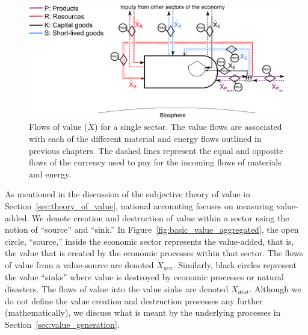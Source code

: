 \begin{figure}[!ht]
\centering
\includegraphics[width=\linewidth]{Part_2/Chapter_Values/images/PERKS_basic_unit_value_all.pdf}
\caption[Flows of value for a single sector]{Flows of value ($\dot{X}$) 
for a single sector. 
The value flows are associated with each of the different 
material and energy flows outlined in previous chapters. The dashed
lines represent the equal and opposite flows of the 
currency used to pay for the incoming flows of 
materials and energy.}
\label{fig:basic_value} 
\end{figure}

As mentioned in the discussion of the subjective theory of value in Section~\ref{sec:theory_of_value}, national accounting focuses on
measuring value-added. We denote creation and destruction
of value within a sector using the notion of ``source'' and ``sink.''
In Figure~\ref{fig:basic_value_aggregated}, the open circle, 
``source,'' inside the economic sector represents the value-added,
that is, the value that is created by the economic processes within that sector. 
The flows of value from a value-source are denoted $\dot{X}_{gen}$. 
Similarly, black circles represent the value ``sinks''  where value is destroyed 
by economic  processes or natural disasters. 
The flows of value into the value sinks are denoted $\dot{X}_{dest}$. 
Although we do not define 
the value creation and destruction processes any further (mathematically), 
we discuss what is meant by the
underlying processes in Section~\ref{sec:value_generation}.

